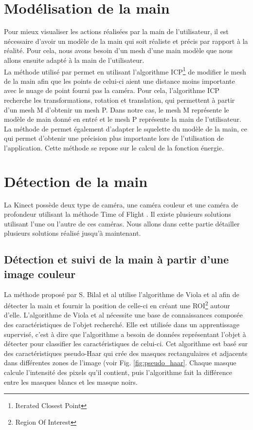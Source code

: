 \section{Modélisation de la main}
Pour mieux visualiser les actions réalisées par la main de l'utilisateur, il est nécessaire d'avoir
un modèle de la main qui soit réaliste et précis par rapport à la réalité. Pour cela, nous avons besoin d'un
mesh d'une main modèle que nous allons ensuite adapté à la main de l'utilisateur.\\

La méthode utilisé par \cite{export:217428} permet en utilisant l'algorithme
ICP\footnote{Iterated Closest Point} \cite{121791} de modifier le mesh de la main afin
que les points de celui-ci aient une distance moins importante avec le nuage de point fourni pas la 
caméra. Pour cela, l'algorithme ICP recherche les transformations, rotation et translation, qui permettent 
à partir d'un mesh M d'obtenir un mesh P. Dans notre cas, le mesh M représente le modèle de main donné en entré
et le mesh P représente la main de l'utilisateur.\\ 

La méthode de \cite{export:217428} permet également d'adapter le squelette du modèle de la 
main, ce qui permet d'obtenir une précision plus importante lors de l'utilisation de l'application.
Cette méthode se repose sur le calcul de la fonction énergie.

\section{Détection de la main}

La Kinect possède deux type de caméra, une caméra couleur et une caméra de profondeur utilisant la méthode 
\og Time of Flight \fg. Il existe plusieurs solutions utilisant l'une ou l'autre de ces caméras. Nous allons
dans cette partie détailler plusieurs solutions réalisé jusqu'à maintenant.

\subsection{Détection et suivi de la main à partir d'une image couleur}
La méthode proposé par S. Bilal et al \cite{} utilise l'algorithme de Viola et al \cite{viola2001jones} afin
de détecter la main et fournir la position de celle-ci en créant une ROI\footnote{Region Of Interest} autour d'elle.
L'algorithme de Viola et al \cite{viola2001jones} nécessite une 
base de connaissances composée des caractéristiques de l'objet recherché. Elle est utilisée dans un 
apprentissage supervisé, c'est à dire que l'algorithme a besoin de données représentant
l'objet à détecter pour classifier les caractéristiques de celui-ci. Cet algorithme est basé sur des caractéristiques 
pseudo-Haar qui crée des masques rectangulaires et adjacents dans différentes zones de l'image (voir Fig. \ref{fig:pseudo_haar}. 
Chaque masque calcule l'intensité des pixels qu'il contient, puis l'algorithme fait la différence entre les masques blancs et les masque noirs.\\

